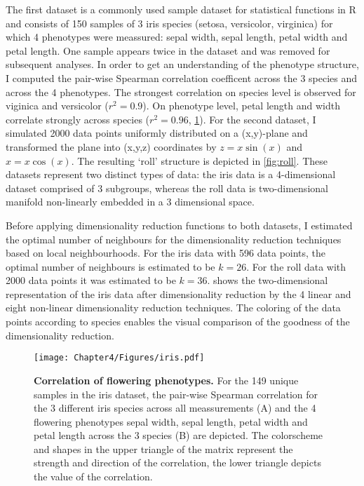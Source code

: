 The first dataset is a commonly used sample dataset for statistical functions in R and consists of \num{150} samples of \num{3} iris species (setosa, versicolor, virginica) for which \num{4} phenotypes were meassured:  sepal width, sepal length, petal width and petal length. One sample appears twice in the dataset and was removed for subsequent analyses. In order to get an understanding of the phenotype structure, I computed the pair-wise Spearman correlation coefficent across the \num{3} species and across the \num{4} phenotypes. The strongest correlation on species level is observed for viginica and versicolor (\(r^2=0.9\)). On phenotype level, petal length and width correlate strongly across species (\(r^2=0.96\), \cref{fig:iris}). For the second dataset, I simulated \num{2000} data points uniformly distributed on a (x,y)-plane and transformed the plane into (x,y,z) coordinates by \(z = x \sin(x)\) and \(x = x \cos(x)\). The resulting `roll' structure is depicted in \cref{fig:roll}. These datasets represent two distinct types of data: the iris data is a \num{4}-dimensional dataset comprised of \num{3} subgroups, whereas the roll data is two-dimensional manifold non-linearly embedded in a \num{3} dimensional space. 

Before applying dimensionality reduction functions to both datasets, I estimated the optimal number of neighbours for the dimensionality reduction techniques based on local neighbourhoods. For the iris data with \num{596} data points, the optimal number of neighbours is estimated to be \(k=26\). For the roll data with \num{2000} data points it was estimated to be \(k=36\).  shows the two-dimensional representation of the iris data after dimensionality reduction by the \num{4} linear and eight non-linear dimensionality reduction techniques. The coloring of the data points according to species enables the visual comparison of the goodness of the dimensionality reduction.

\begin{figure}[h]
	\centering
			\texttt{[image: Chapter4/Figures/iris.pdf]}		
	\caption[\textbf{Correlation of flowering phenotypes.} Generated via R function \textit{corrplot::corrplot}]{\textbf{Correlation of flowering phenotypes.} For the \num{149} unique samples in the iris dataset, the pair-wise Spearman correlation for the \num{3} different iris species across all meassurements (A) and the \num{4} flowering phenotypes sepal width, sepal length, petal width and petal length across the \num{3} species (B) are depicted. The colorscheme and shapes in the upper triangle of the matrix represent the strength and direction of the correlation, the lower triangle depicts the value of the correlation.} 
		\label{fig:iris}
\end{figure}%

